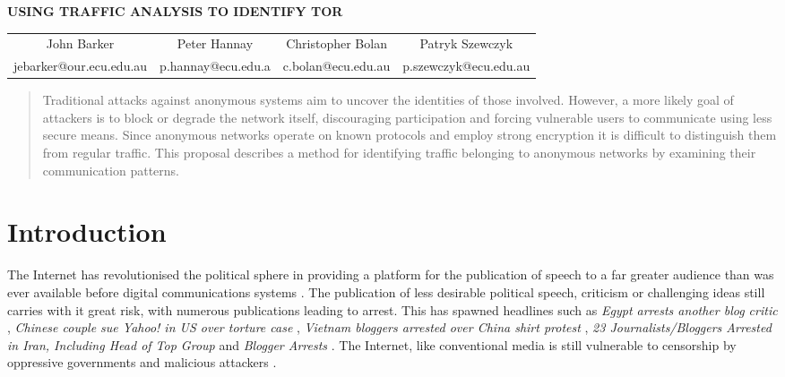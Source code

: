 \documentclass{conference}
\begin{document}
{\center \Large \bfseries \MakeUppercase{Using traffic analysis to identify Tor} \par}

{ \center
  \begin{tabular*}{\textwidth}{cccc}
  John Barker & Peter Hannay & Christopher Bolan & Patryk Szewczyk \\
  jebarker@our.ecu.edu.au & p.hannay@ecu.edu.a & c.bolan@ecu.edu.au & p.szewczyk@ecu.edu.au \\
  \end{tabular*}
}

\begin{abstract}

Traditional attacks against anonymous systems aim to uncover the identities of those involved. However, a more likely goal of attackers is to block or degrade the network itself, discouraging participation and forcing vulnerable users to communicate using less secure means. Since anonymous networks operate on known protocols and employ strong encryption it is difficult to distinguish them from regular traffic. This proposal describes a method for identifying traffic belonging to anonymous networks by examining their communication patterns.

\end{abstract}

\section{Introduction}

The Internet has revolutionised the political sphere in providing a platform for the publication of speech to a far greater audience than was ever available before digital communications systems \citep{Bonchek:1997p3455}. The publication of less desirable political speech, criticism or challenging ideas still carries with it great risk, with numerous publications leading to arrest. This has spawned headlines such as \emph{Egypt arrests another blog critic} \citeyear{website:egypt-arrests}, \emph{Chinese couple sue Yahoo! in US over torture case} \citep{website:china-yahoo-torture}, \emph{Vietnam bloggers arrested over China shirt protest} \citep{website:vietnam-bloggers-arrested}, \emph{23 Journalists/Bloggers Arrested in Iran, Including Head of Top Group} \citeyear{website:iran-bloggers-arrested} and \emph{Blogger Arrests} \citep{website:blogger-arrests}. The Internet, like conventional media is still vulnerable to censorship by oppressive governments and malicious attackers \citep{Crandall:2007p6165,Karlin:2009p6166}.
\end{document}
